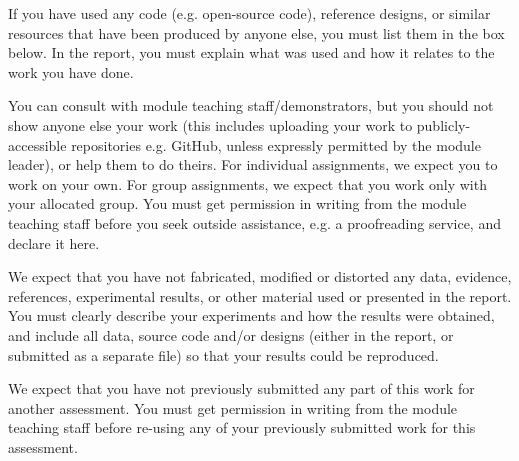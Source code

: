 {        If you have used any code (e.g. open-source code), reference designs, or similar resources that have been produced by anyone else, you must list them in the box below. In the report, you must explain what was used and how it relates to the work you have done.
 
        \noindent{}
        
        You can consult with module teaching staff/demonstrators, but you should not show anyone else your work (this includes uploading your work to publicly-accessible repositories e.g. GitHub, unless expressly permitted by the module leader), or help them to do theirs. For individual assignments, we expect you to work on your own. For group assignments, we expect that you work only with your allocated group. You must get permission in writing from the module teaching staff before you seek outside assistance, e.g. a proofreading service, and declare it here.
        
        \noindent{}
        
        We expect that you have not fabricated, modified or distorted any data, evidence, references, experimental results, or other material used or presented in the report. You must clearly describe your experiments and how the results were obtained, and include all data, source code and/or designs (either in the report, or submitted as a separate file) so that your results could be reproduced.

        \noindent{}
        
        We expect that you have not previously submitted any part of this work for another assessment. You must get permission in writing from the module teaching staff before re-using any of your previously submitted work for this assessment.
         
        \noindent{}
        
}
